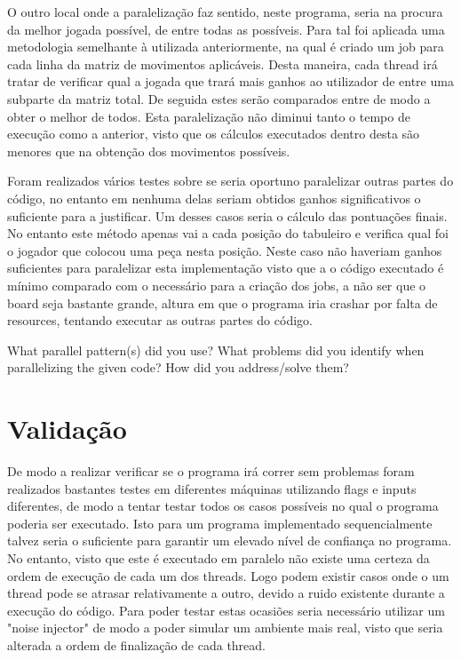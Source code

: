 \documentclass[a4paper]{article}
\begin{document}
O outro local onde a paralelização faz sentido, neste programa, seria na procura da melhor jogada possível, de entre todas as possíveis. Para tal foi aplicada uma metodologia semelhante à utilizada anteriormente, na qual é criado um job para cada linha da matriz de movimentos aplicáveis. Desta maneira, cada thread irá tratar de verificar qual a jogada que trará mais ganhos ao utilizador de entre uma subparte da matriz total. De seguida estes serão comparados entre de modo a obter o melhor de todos. Esta paralelização não diminui tanto o tempo de execução como a anterior, visto que os cálculos executados dentro desta são menores que na obtenção dos movimentos possíveis.

Foram realizados vários testes sobre se seria oportuno paralelizar outras partes do código, no entanto em nenhuma delas seriam obtidos ganhos significativos o suficiente para a justificar. Um desses casos seria o cálculo das pontuações finais. No entanto este método apenas vai a cada posição do tabuleiro e verifica qual foi o jogador que colocou uma peça nesta posição. Neste caso não haveriam ganhos suficientes para paralelizar esta implementação visto que a o código executado é mínimo comparado com o necessário para a criação dos jobs, a não ser que o board seja bastante grande, altura em que o programa iria crashar por falta de resources, tentando executar as outras partes do código.




What	parallel	pattern(s)	did	you	use?	 What	problems	did	you	
identify	 when	 parallelizing	 the	 given	 code?	 	 How	 did	 you	 address/solve	 them?	


\section{Validação}
De modo a realizar verificar se o programa irá correr sem problemas foram realizados bastantes testes em diferentes máquinas utilizando flags e inputs diferentes, de modo a tentar testar todos os casos possíveis no qual o programa poderia ser executado.
Isto para um programa implementado sequencialmente talvez seria o suficiente para garantir um elevado nível de confiança no programa. No entanto, visto que este é executado em paralelo não existe uma certeza da ordem de execução de cada um dos threads. Logo podem existir casos onde o um thread pode se atrasar relativamente a outro, devido a ruido existente durante a execução do código. Para poder testar estas ocasiões seria necessário utilizar um "noise injector" de modo a poder simular um ambiente mais real, visto que seria alterada a ordem de finalização de cada thread.
\end{document}
